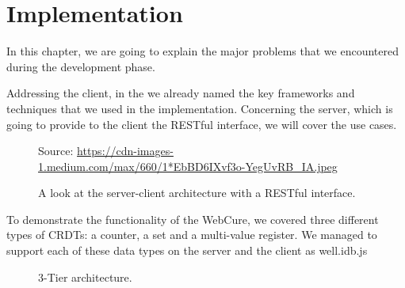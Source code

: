 \chapter{Implementation}
\label{Implementation}

In this chapter, we are going to explain the major problems that we encountered during the development phase.

Addressing the client, in the  we already named the key frameworks and techniques that we used in the implementation. Concerning the server, which is going to provide to the client the RESTful interface, we will cover the use cases.

\begin{figure}[!htb]
    \begin{center}
    \setlength{\fboxsep}{4pt}%
    \setlength{\fboxrule}{1pt}%
    {\scriptsize%
     Source: \url{https://cdn-images-1.medium.com/max/660/1*EbBD6IXvf3o-YegUvRB_IA.jpeg}}
    \caption {A look at the server-client architecture with a RESTful interface.}
    \label{fig:design1}
\end{center}
\end{figure}

To demonstrate the functionality of the WebCure, we covered three different types of CRDTs: a counter, a set and a multi-value register. We managed to support each of these data types on the server and the client as well.idb.js

\begin{figure}[!htb]
    \begin{center}
    \def\svgwidth{\linewidth}
    
    \caption {3-Tier architecture.}
    \label{fig:dev1}
\end{center}
\end{figure}



